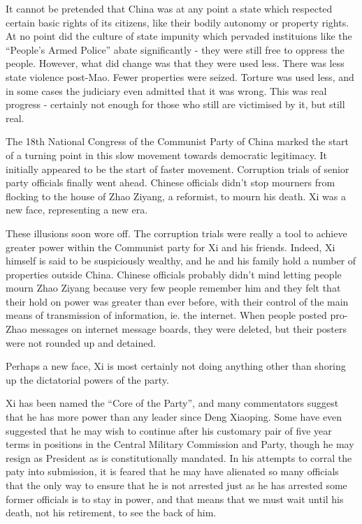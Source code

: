 	It cannot be pretended that China was at any point a state which respected certain basic rights of its citizens, like their bodily autonomy or property rights. At no point did the culture of state impunity which pervaded instituions like the ``People's Armed Police'' abate significantly - they were still free to oppress the people. However, what did change was that they were used less. There was less state violence post-Mao. Fewer properties were seized. Torture was used less, and in some cases the judiciary even admitted that it was wrong. This was real progress - certainly not enough for those who still are victimised by it, but still real.

	The 18th National Congress of the Communist Party of China marked the start of a turning point in this slow movement towards democratic legitimacy. It initially appeared to be the start of faster movement. Corruption trials of senior party officials finally went ahead. Chinese officials didn't stop mourners from flocking to the house of Zhao Ziyang, a reformist, to mourn his death. Xi was a new face, representing a new era.

	These illusions soon wore off. The corruption trials were really a tool to achieve greater power within the Communist party for Xi and his friends. Indeed, Xi himself is said to be suspiciously wealthy, and he and his family hold a number of properties outside China. Chinese officials probably didn't mind letting people mourn Zhao Ziyang because very few people remember him and they felt that their hold on power was greater than ever before, with their control of the main means of transmission of information, ie. the internet. When people posted pro-Zhao messages on internet message boards, they were deleted, but their posters were not rounded up and detained.

	Perhaps a new face, Xi is most certainly not doing anything other than shoring up the dictatorial powers of the party.

	Xi has been named the ``Core of the Party'', and many commentators suggest that he has more power than any leader since Deng Xiaoping. Some have even suggested that he may wish to continue after his customary pair of five year terms in positions in the Central Military Commission and Party, though he may resign as President as is constitutionally mandated. In his attempts to corral the paty into submission, it is feared that he may have alienated so many officials that the only way to ensure that he is not arrested just as he has arrested some former officials is to stay in power, and that means that we must wait until his death, not his retirement, to see the back of him.

